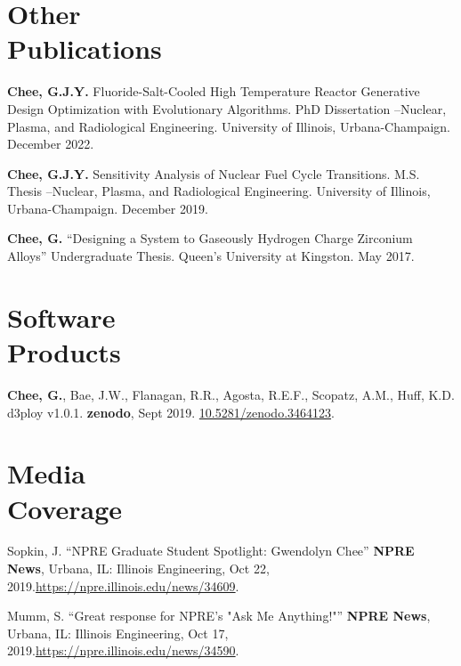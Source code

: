 \documentclass[margin,line]{resume}
\begin{document}
\begin{resume}
    \section{\mysidestyle Other\\Publications}
    \begin{bibenum}
        \item \textbf{Chee, G.J.Y.} Fluoride-Salt-Cooled High Temperature Reactor Generative
        Design Optimization with Evolutionary Algorithms.
        PhD Dissertation --Nuclear, Plasma, and Radiological Engineering.
        University of Illinois, Urbana-Champaign.  December 2022.
      \item \textbf{Chee, G.J.Y.} Sensitivity Analysis of Nuclear Fuel Cycle Transitions. 
        M.S. Thesis --Nuclear, Plasma, and Radiological Engineering.
        University of Illinois, Urbana-Champaign.  December 2019.
      \item \textbf{Chee, G.} ``Designing a System to Gaseously Hydrogen Charge Zirconium Alloys''
        Undergraduate Thesis. Queen's University at Kingston. May 2017.
    \end{bibenum}
    \section{\mysidestyle Software\\Products}
    \begin{bibenum}
    \item \textbf{Chee, G.}, Bae, J.W., Flanagan, R.R., Agosta, R.E.F., Scopatz, A.M.,
    Huff, K.D. d3ploy v1.0.1. \textbf{zenodo}, Sept 2019. 
            \url{10.5281/zenodo.3464123}.
    \end{bibenum}

    \section{\mysidestyle Media\\Coverage}
    \begin{bibenum}
        \item Sopkin, J. ``NPRE Graduate Student Spotlight: Gwendolyn Chee'' \textbf{NPRE News}, Urbana, IL: Illinois Engineering, Oct 22, 2019.\url{https://npre.illinois.edu/news/34609}.
        \item Mumm, S. ``Great response for NPRE's "Ask Me Anything!"'' \textbf{NPRE News}, Urbana, IL: Illinois Engineering, Oct 17, 2019.\url{https://npre.illinois.edu/news/34590}.
	\end{bibenum}
 

\end{resume}
\end{document}
